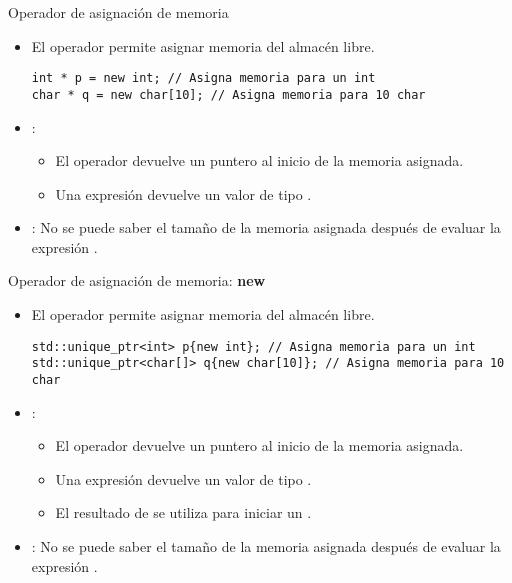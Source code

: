 \begin{frame}[t,fragile]{Operador de asignación de memoria}
\begin{itemize}
  \item El operador  permite asignar memoria del almacén libre.
\begin{lstlisting}
int * p = new int; // Asigna memoria para un int
char * q = new char[10]; // Asigna memoria para 10 char
\end{lstlisting}

  \item {}:
    \begin{itemize}
      \item El operador  devuelve un puntero al inicio de la memoria asignada.
      \item Una expresión   devuelve un valor de tipo .
    \end{itemize}

  \item {}: No se puede saber el tamaño de la memoria asignada 
        después de evaluar la expresión .
\end{itemize}
\end{frame}

\begin{frame}[t,fragile]{Operador de asignación de memoria: \textbf{new}}
\begin{itemize}
  \item El operador  permite asignar memoria del almacén libre.
\begin{lstlisting}
std::unique_ptr<int> p{new int}; // Asigna memoria para un int
std::unique_ptr<char[]> q{new char[10]}; // Asigna memoria para 10 char
\end{lstlisting}

  \item {}:
    \begin{itemize}
      \item El operador  devuelve un puntero al inicio de la memoria asignada.
      \item Una expresión   devuelve un valor de tipo .
      \item El resultado de  se utiliza para iniciar un .
    \end{itemize}

  \item {}: No se puede saber el tamaño de la memoria asignada 
        después de evaluar la expresión .
\end{itemize}
\end{frame}

